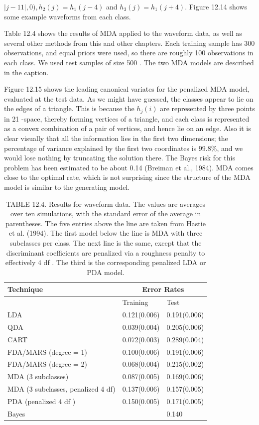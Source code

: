 \documentclass[10pt]{article}
\begin{document}
$|j-11|, 0), h_{2}(j)=h_{1}(j-4)$ and $h_{3}(j)=h_{1}(j+4)$. Figure 12.14 shows some example waveforms from each class.

Table 12.4 shows the results of MDA applied to the waveform data, as well as several other methods from this and other chapters. Each training sample has 300 observations, and equal priors were used, so there are roughly 100 observations in each class. We used test samples of size 500 . The two MDA models are described in the caption.

Figure 12.15 shows the leading canonical variates for the penalized MDA model, evaluated at the test data. As we might have guessed, the classes appear to lie on the edges of a triangle. This is because the $h_{j}(i)$ are represented by three points in 21 -space, thereby forming vertices of a triangle, and each class is represented as a convex combination of a pair of vertices, and hence lie on an edge. Also it is clear visually that all the information lies in the first two dimensions; the percentage of variance explained by the first two coordinates is $99.8 \%$, and we would lose nothing by truncating the solution there. The Bayes risk for this problem has been estimated to be about 0.14 (Breiman et al., 1984). MDA comes close to the optimal rate, which is not surprising since the structure of the MDA model is similar to the generating model.

\begin{table}[h]
\begin{center}
\captionsetup{labelformat=empty}
\caption{TABLE 12.4. Results for waveform data. The values are averages over ten simulations, with the standard error of the average in parentheses. The five entries above the line are taken from Hastie et al. (1994). The first model below the line is MDA with three subclasses per class. The next line is the same, except that the discriminant coefficients are penalized via a roughness penalty to effectively 4 df . The third is the corresponding penalized LDA or PDA model.}
\begin{tabular}{|l|l|l|}
\hline
\multirow[t]{2}{*}{Technique} & \multicolumn{2}{|c|}{Error Rates} \\
\hline
 & Training & Test \\
\hline
LDA & 0.121(0.006) & 0.191(0.006) \\
\hline
QDA & 0.039(0.004) & 0.205(0.006) \\
\hline
CART & 0.072(0.003) & 0.289(0.004) \\
\hline
FDA/MARS (degree = 1) & 0.100(0.006) & 0.191(0.006) \\
\hline
FDA/MARS (degree = 2) & 0.068(0.004) & 0.215(0.002) \\
\hline
MDA (3 subclasses) & 0.087(0.005) & 0.169(0.006) \\
\hline
MDA (3 subclasses, penalized 4 df) & 0.137(0.006) & 0.157(0.005) \\
\hline
PDA (penalized 4 df ) & 0.150(0.005) & 0.171(0.005) \\
\hline
Bayes &  & 0.140 \\
\hline
\end{tabular}
\end{center}
\end{table}
\end{document}
